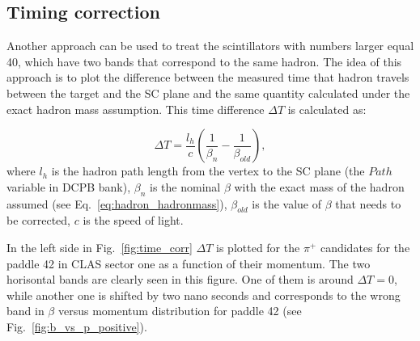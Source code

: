 \subsection{Timing correction}
\label{time_corr}

Another approach can be used to treat the scintillators with numbers larger equal 40, which have two bands that  correspond to the same hadron. 
The idea of this approach is to plot the difference between the measured time that hadron travels between the target and the SC plane and the same quantity calculated under the exact hadron mass assumption.
This time difference $\Delta T$ is calculated as:

\begin{equation}
\Delta T=\frac{l_{h}}{c}\left ( \frac{1}{\beta_{n} } -\frac{1}{\beta _{old}}\right ),
\label{eq:time_corr_delta_T}
\end{equation}
where $l_{h}$ is the hadron path length from the vertex to the SC plane (the $Path$ variable in DCPB bank), $\beta_{n}$ is the nominal $\beta$ with the exact mass of the hadron assumed (see Eq.~\ref{eq:hadron_hadronmass}), $\beta_{old}$ is the value of $\beta$ that needs to be corrected, $c$ is the speed of light.

In the left side in Fig.~\ref{fig:time_corr} $\Delta T$ is plotted for the $\pi^{+}$ candidates for the paddle 42 in CLAS sector one as a function of their momentum. The two horisontal bands are clearly seen in this figure. One of them is around $\Delta T = 0$, while another one is shifted by two nano seconds and corresponds to the wrong band in $\beta$ versus momentum distribution for paddle 42 (see Fig.~\ref{fig:b_vs_p_positive}).




